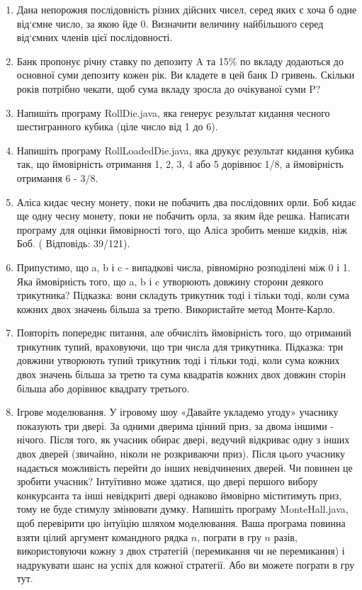 \documentclass[]{article}
\begin{document}
\begin{enumerate}
\item Дана непорожня послідовність різних дійсних чисел, серед яких є хоча б одне від`ємне число, за якою йде 0. Визначити величину найбільшого серед від`ємних членів цієї послідовності.
\item Банк пропонує річну ставку по депозиту A та 15\% по вкладу додаються до основної суми депозиту кожен рік. Ви кладете в цей банк D гривень. Скільки років потрібно чекати, щоб сума вкладу зросла  до очікуваної суми P? 


\item Напишіть програму RollDie.java, яка генерує результат кидання чесного шестигранного кубика (ціле число від 1 до 6).

\item  Напишіть програму RollLoadedDie.java, яка друкує результат кидання кубика так,
що ймовірність отримання 1, 2, 3, 4 або 5 дорівнює 1/8, а ймовірність отримання 6 - 3/8.

 \item Аліса кидає чесну монету, поки не побачить два послідовних орли.
Боб кидає ще одну чесну монету, поки не побачить орла, за яким йде решка.
Написати програму для оцінки ймовірності того, що Аліса зробить менше кидків, ніж Боб.
( Відповідь: 39/121).
\item
 Припустимо, що a, b і c - випадкові числа, рівномірно розподілені між 0 і 1.
 Яка ймовірність того, що a, b і c утворюють довжину сторони деякого трикутника?
Підказка: вони складуть трикутник тоді і тільки тоді, коли сума кожних двох значень більша за третю. Використайте метод Монте-Карло.

\item Повторіть попереднє питання, але обчисліть ймовірність того, що отриманий трикутник тупий, враховуючи, що три числа для трикутника.
Підказка: три довжини утворюють тупий трикутник тоді і тільки тоді, коли сума кожних двох значень більша за третю та сума квадратів кожних двох довжин сторін більша або дорівнює квадрату третього.

\item Ігрове моделювання.
У ігровому шоу «Давайте укладемо угоду» учаснику показують три двері.
За одними дверима цінний приз, за двома іншими - нічого.
Після того, як учасник обирає двері, ведучий відкриває одну з інших двох дверей (звичайно, ніколи не розкриваючи приз).
Після цього учаснику надається можливість перейти до інших невідчинених дверей.
Чи повинен це зробити учасник? Інтуїтивно може здатися, що двері першого вибору конкурсанта та інші невідкриті двері однаково ймовірно міститимуть приз, тому не буде стимулу змінювати думку.
Напишіть програму MonteHall.java, щоб перевірити цю інтуїцію шляхом моделювання.
 Ваша програма повинна взяти цілий аргумент командного рядка $n$, пограти в гру $n$ разів,
використовуючи кожну з двох стратегій (перемикання чи не перемикання) і надрукувати шанс на успіх для кожної стратегії.
Або ви можете пограти в гру тут.

\end{enumerate}
\end{document}

